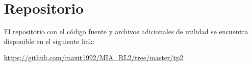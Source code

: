 
\chapter{Repositorio} %

\label{Repositorio}

El repositorio con el código fuente y archivos adicionales de utilidad se encuentra disponible en el siguiente link:

\url{https://github.com/maxit1992/MIA_RL2/tree/master/tp2}

